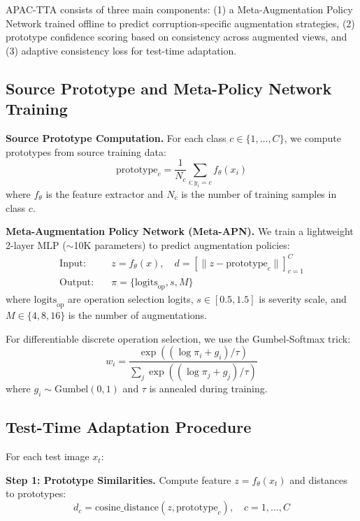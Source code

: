 \documentclass{article}
\begin{document}
APAC-TTA consists of three main components: (1) a Meta-Augmentation Policy Network trained offline to predict corruption-specific augmentation strategies, (2) prototype confidence scoring based on consistency across augmented views, and (3) adaptive consistency loss for test-time adaptation.

\subsection{Source Prototype and Meta-Policy Network Training}

\textbf{Source Prototype Computation.} For each class $c \in \{1, \ldots, C\}$, we compute prototypes from source training data:
\begin{equation}
    \text{prototype}_c = \frac{1}{N_c} \sum_{i: y_i = c} f_\theta(x_i)
\end{equation}
where $f_\theta$ is the feature extractor and $N_c$ is the number of training samples in class $c$.

\textbf{Meta-Augmentation Policy Network (Meta-APN).} We train a lightweight 2-layer MLP ($\sim$10K parameters) to predict augmentation policies:
\begin{align}
    \text{Input:} \quad & z = f_\theta(x), \quad d = [\|z - \text{prototype}_c\|]_{c=1}^C \\
    \text{Output:} \quad & \pi = \{\text{logits}_{\text{op}}, s, M\}
\end{align}
where $\text{logits}_{\text{op}}$ are operation selection logits, $s \in [0.5, 1.5]$ is severity scale, and $M \in \{4, 8, 16\}$ is the number of augmentations.

For differentiable discrete operation selection, we use the Gumbel-Softmax trick:
\begin{equation}
    w_i = \frac{\exp((\log \pi_i + g_i) / \tau)}{\sum_j \exp((\log \pi_j + g_j) / \tau)}
\end{equation}
where $g_i \sim \text{Gumbel}(0,1)$ and $\tau$ is annealed during training.

\subsection{Test-Time Adaptation Procedure}

For each test image $x_t$:

\textbf{Step 1: Prototype Similarities.} Compute feature $z = f_\theta(x_t)$ and distances to prototypes:
\begin{equation}
    d_c = \text{cosine\_distance}(z, \text{prototype}_c), \quad c = 1, \ldots, C
\end{equation}
\end{document}
